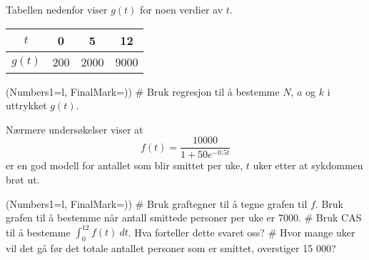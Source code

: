 \documentclass[12pt, a4paper]{article}
\begin{document}
Tabellen nedenfor viser $g(t)$ for noen verdier av $t$.
\begin{center}
	\begin{tabular}{|c|c|c|c|}
		\hline 
		$t$ & 0 & 5 & 12 \\ \hline
		$g(t)$ & 200 & 2000 & 9000 \\ \hline
	\end{tabular}
\end{center}

\begin{easylist}[enumerate]
	\ListProperties(Numbers1=l, FinalMark={)})
	# Bruk regresjon til å bestemme $N$, $a$ og $k$ i uttrykket
	$g(t)$.
\end{easylist}
Nærmere undersøkelser viser at
\begin{equation*}
f(t) = \frac{10000}{1 + 50e^{-0.5t}}
\end{equation*}
er en god modell for antallet som blir smittet per uke, $t$
uker etter at sykdommen brøt ut.
\begin{easylist}
	\ListProperties(Numbers1=l, FinalMark={)})
	# Bruk graftegner til å tegne grafen til $f$.
	Bruk grafen til å bestemme når antall smittede
	personer per uke er 7000.
	# Bruk CAS til å bestemme $\int_{0}^{12} f(t) \ dt$.
	Hva forteller dette svaret oss?
	# Hvor mange uker vil det gå før det totale antallet 
	personer som er smittet, overstiger 15 000?
\end{easylist}
\vfill
\end{document}
